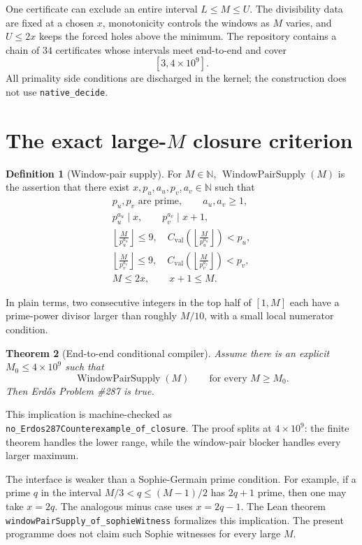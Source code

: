 \documentclass[11pt]{article}
\newtheorem{theorem}{Theorem}[section]
\theoremstyle{definition}
\newtheorem{definition}[theorem]{Definition}
\newcommand{\N}{\mathbb N}
\newcommand{\1}{\mathbf 1}
\newcommand{\WPS}{\operatorname{WindowPairSupply}}
\begin{document}
One certificate can exclude an entire interval $L\le M\le U$.  The divisibility data are
fixed at a chosen $x$, monotonicity controls the windows as $M$ varies, and $U\le2x$
keeps the forced holes above the minimum.  The repository contains a chain of $34$
certificates whose intervals meet end-to-end and cover
\[
[3,4\times10^9].
\]
All primality side conditions are discharged in the kernel; the construction does not use
\texttt{native\_decide}.

\section{The exact large-$M$ closure criterion}

\begin{definition}[Window-pair supply]
For $M\in\N$, $\WPS(M)$ is the assertion that there exist
$x,p_u,a_u,p_v,a_v\in\N$ such that
\[
\begin{gathered}
p_u,p_v\text{ are prime},\qquad a_u,a_v\ge1,\\
p_u^{a_u}\mid x,\qquad p_v^{a_v}\mid x+1,\\
\left\lfloor\frac M{p_u^{a_u}}\right\rfloor\le9,
\quad C_{\mathrm{val}}\!\left(\left\lfloor\frac M{p_u^{a_u}}\right\rfloor\right)<p_u,\\
\left\lfloor\frac M{p_v^{a_v}}\right\rfloor\le9,
\quad C_{\mathrm{val}}\!\left(\left\lfloor\frac M{p_v^{a_v}}\right\rfloor\right)<p_v,\\
M\le2x,
\qquad x+1\le M.
\end{gathered}
\]
\end{definition}

In plain terms, two consecutive integers in the top half of $[1,M]$ each have a
prime-power divisor larger than roughly $M/10$, with a small local numerator condition.

\begin{theorem}[End-to-end conditional compiler]
Assume there is an explicit $M_0\le4\times10^9$ such that
\[
\WPS(M)\qquad\text{for every }M\ge M_0.
\]
Then Erd\H{o}s Problem \#287 is true.
\end{theorem}

This implication is machine-checked as
\texttt{no\_Erdos287Counterexample\_of\_closure}.  The proof splits at
$4\times10^9$: the finite theorem handles the lower range, while the window-pair blocker
handles every larger maximum.

The interface is weaker than a Sophie-Germain prime condition.  For example, if a prime
$q$ in the interval $M/3<q\le(M-1)/2$ has $2q+1$ prime, then one may take
$x=2q$.  The analogous minus case uses $x=2q-1$.  The Lean theorem
\texttt{windowPairSupply\_of\_sophieWitness} formalizes this implication.  The present
programme does not claim such Sophie witnesses for every large $M$.
\end{document}

